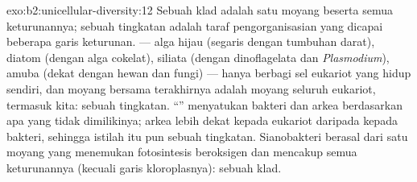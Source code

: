 \begin{solution}{exo:b2:unicellular-diversity:12}
Sebuah klad adalah satu moyang beserta semua keturunannya; sebuah
tingkatan adalah taraf pengorganisasian yang dicapai beberapa garis
keturunan.  --- alga hijau (segaris dengan tumbuhan darat),
diatom (dengan alga cokelat), siliata (dengan dinoflagelata dan
\emph{Plasmodium}), amuba (dekat dengan hewan dan fungi) --- hanya
berbagi sel eukariot yang hidup sendiri, dan moyang bersama
terakhirnya adalah moyang seluruh eukariot, termasuk kita: sebuah
tingkatan. ``'' menyatukan bakteri dan arkea berdasarkan apa
yang tidak dimilikinya; arkea lebih dekat kepada eukariot daripada
kepada bakteri, sehingga istilah itu pun sebuah tingkatan.
Sianobakteri berasal dari satu moyang yang menemukan fotosintesis
beroksigen dan mencakup semua keturunannya (kecuali garis
kloroplasnya): sebuah klad.
\end{solution}


